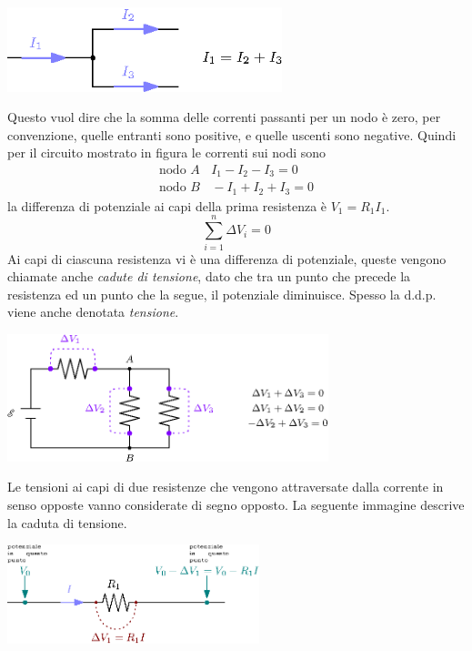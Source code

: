 \documentclass[10pt, letterpaper]{report}
\begin{document}
\begin{center}
    \includegraphics[width=0.6\textwidth]{images/Kirchhoff1.eps}
\end{center}
Questo vuol dire che la somma delle correnti passanti per un nodo è zero, per convenzione, quelle entranti sono positive, e quelle uscenti sono negative. Quindi per il circuito mostrato in figura le correnti sui nodi sono 
$$ \begin{matrix}
    \text{nodo }A \ \ \ \ I_1-I_2-I_3=0\\ 
    \text{nodo }B \ \ \ \ -I_1+I_2+I_3=0
\end{matrix}$$
la differenza di potenziale ai capi della prima resistenza è $V_1=R_1I_1$.
$$ \sum_{i=1}^n\Delta V_i=0$$
Ai capi di ciascuna resistenza vi è una differenza di potenziale, queste vengono chiamate anche \textit{cadute di tensione}, dato che tra un punto che precede la resistenza ed un punto che la segue, il potenziale diminuisce. Spesso la d.d.p. viene anche denotata \textit{tensione}.
\begin{center}
    \includegraphics[width=0.7\textwidth]{images/kirchoff2.eps}
\end{center}
Le tensioni ai capi di due resistenze che vengono attraversate dalla corrente in senso opposte vanno considerate di segno opposto. La seguente immagine descrive la caduta di tensione.
\begin{center}
    \includegraphics[width=0.55\textwidth]{images/cadutaDiTensione.eps}
\end{center}
\end{document}
